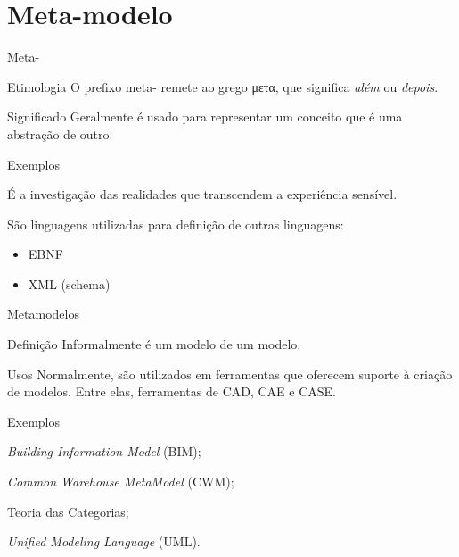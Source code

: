 \documentclass[12pt,t]{beamer}
\begin{document}
 \section{Meta-modelo}
	 \begin{frame}{Meta-}
	 	\begin{block}{Etimologia}
	 		O prefixo meta- remete ao grego μετα, que significa \emph{além} ou \emph{depois}.
	 	\end{block}
	 	\begin{block}{Significado}
	 		Geralmente é usado para representar um conceito que é uma abstração de outro.
	 	\end{block}
	 	\begin{exampleblock}{Exemplos}
	 		\begin{description}[Metalinguagem]
	 			\item [Metafísica] É a investigação das realidades que transcendem a experiência sensível.
	 			\item [Metalinguagem] São linguagens utilizadas para definição de outras linguagens:
	 			\begin{itemize}
	 				\item EBNF 
	 				\item XML (schema)
	 			\end{itemize}
	 		\end{description}
	 	\end{exampleblock}
	 	\end{frame}
	 	\begin{frame}{Metamodelos}
	 		\begin{block}{Definição}
	 			Informalmente é um modelo de um modelo.
	 		\end{block}
	 		\begin{block}{Usos}
	 			Normalmente, são utilizados em ferramentas que oferecem suporte à criação de modelos. Entre elas, ferramentas de CAD, CAE e CASE.
	 		\end{block}
	 		\begin{exampleblock}{Exemplos}
	 			\begin{description}[Datawarehousing]
	 			\item [Construção Civil] \emph{Building Information Model} (BIM);
	 			\item [Datawarehousing]		
	 		\emph{Common Warehouse MetaModel} (CWM);
	 			\item [Matemática] Teoria das Categorias;
	 			\item [Programas OO] \emph{Unified Modeling Language} (UML).
	 		\end{description}
		\end{exampleblock}
	 \end{frame}
\end{document}
